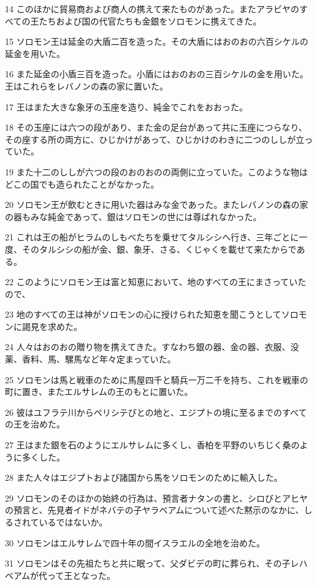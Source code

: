 \par 14 このほかに貿易商および商人の携えて来たものがあった。またアラビヤのすべての王たちおよび国の代官たちも金銀をソロモンに携えてきた。
\par 15 ソロモン王は延金の大盾二百を造った。その大盾にはおのおの六百シケルの延金を用いた。
\par 16 また延金の小盾三百を造った。小盾にはおのおの三百シケルの金を用いた。王はこれらをレバノンの森の家に置いた。
\par 17 王はまた大きな象牙の玉座を造り、純金でこれをおおった。
\par 18 その玉座には六つの段があり、また金の足台があって共に玉座につらなり、その座する所の両方に、ひじかけがあって、ひじかけのわきに二つのししが立っていた。
\par 19 また十二のししが六つの段のおのおのの両側に立っていた。このような物はどこの国でも造られたことがなかった。
\par 20 ソロモン王が飲むときに用いた器はみな金であった。またレバノンの森の家の器もみな純金であって、銀はソロモンの世には尊ばれなかった。
\par 21 これは王の船がヒラムのしもべたちを乗せてタルシシへ行き、三年ごとに一度、そのタルシシの船が金、銀、象牙、さる、くじゃくを載せて来たからである。
\par 22 このようにソロモン王は富と知恵において、地のすべての王にまさっていたので、
\par 23 地のすべての王は神がソロモンの心に授けられた知恵を聞こうとしてソロモンに謁見を求めた。
\par 24 人々はおのおの贈り物を携えてきた。すなわち銀の器、金の器、衣服、没薬、香料、馬、騾馬など年々定まっていた。
\par 25 ソロモンは馬と戦車のために馬屋四千と騎兵一万二千を持ち、これを戦車の町に置き、またエルサレムの王のもとに置いた。
\par 26 彼はユフラテ川からペリシテびとの地と、エジプトの境に至るまでのすべての王を治めた。
\par 27 王はまた銀を石のようにエルサレムに多くし、香柏を平野のいちじく桑のように多くした。
\par 28 また人々はエジプトおよび諸国から馬をソロモンのために輸入した。
\par 29 ソロモンのそのほかの始終の行為は、預言者ナタンの書と、シロびとアヒヤの預言と、先見者イドがネバテの子ヤラベアムについて述べた黙示のなかに、しるされているではないか。
\par 30 ソロモンはエルサレムで四十年の間イスラエルの全地を治めた。
\par 31 ソロモンはその先祖たちと共に眠って、父ダビデの町に葬られ、その子レハベアムが代って王となった。

